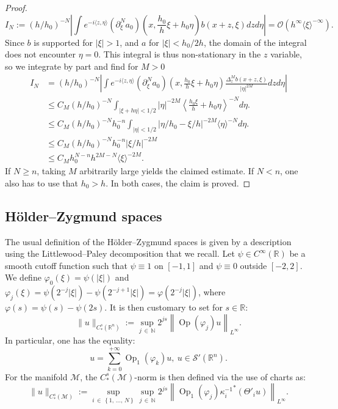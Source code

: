 \documentclass[AHL,Unicode,longabstracts,published]{cedram}
\newcommand{\R}{\mathbb{R}}
\newcommand{\N}{\mathbb{N}}
\newcommand{\M}{\mathcal{M}}
\newcommand{\clO}{\mathcal{O}}
\newcommand{\clS}{\mathcal{S}}
\DeclareMathOperator{\Op}{Op}
\begin{document}
\begin{proof}
\[
I_N :=(h/h_0)^{-N}\left| \int e^{-i \langle z, \eta \rangle } \left(\partial_\xi^N a_0\right)\left(x, \frac{h_0}{h}\xi + h_0\eta\right) b(x+z, \xi) dz d\eta \right| = \clO\left(h^\infty \langle \xi\rangle^{-\infty}\right).
\]
Since $b$ is supported for $|\xi|>1$, and $a$ for $|\xi| < h_0/2h$, the domain of the integral does not encounter $\eta = 0$. This integral is thus non-stationary in the $z$ variable, so we integrate by part and find for $M>0$
\begin{align*}
I_N &= (h/h_0)^{-N} \left| \int e^{-i \langle z, \eta \rangle } \left(\partial_\xi^N a_0\right)\left(x, \frac{h_0}{h}\xi + h_0\eta\right) \frac{\Delta_z^M b(x+z, \xi)}{|\eta|^{2M}} dz d\eta \right| \\
&\leq C_M (h/h_0)^{-N} \int_{|\xi + h\eta|< 1/2} |\eta|^{-2M} \left\langle \frac{h_0\xi}{h}+h_0\eta\right\rangle^{-N} d\eta. \\
&\leq C_M (h/h_0)^{-N} h_0^{-n} \int_{|\eta|< 1/2} \left|\eta/h_0 - \xi/h\right|^{-2M} \langle \eta \rangle^{-N} d\eta.\\
&\leq C_M (h/h_0)^{-N} h_0^{-n} |\xi/h|^{-2M} \\
&\leq C_M h_0^{N-n} h^{2M- N} \langle\xi\rangle^{-2M}.
\end{align*}
If $N \geq n$, taking $M$ arbitrarily large yields the claimed estimate. If $N < n$, one also has to use that $h_0 > h$. In both cases, the claim is proved.
\end{proof}



\subsection{H\"older--Zygmund spaces}\label{ssection:hz-spaces}



The usual definition of the H\"older--Zygmund spaces is given by a description using the Littlewood--Paley decomposition that we recall. Let $\psi \in C^\infty(\R)$ be a smooth cutoff function such that $\psi \equiv 1$ on $[-1,1]$ and $\psi \equiv 0$ outside $[-2,2]$. We define $\varphi_0(\xi) = \psi(|\xi|)$ and $\varphi_j(\xi) = \psi(2^{-j}|\xi|) - \psi(2^{-j+1}|\xi|) = \varphi(2^{-j}|\xi|)$, where $\varphi(s) = \psi(s)-\psi(2s)$. It is then customary to set for $s \in \R$:
\[
\|u\|_{C^s_*(\R^n)} := \sup_{j\,\in\,\N} 2^{js} \left\|\Op(\varphi_j)u\right\|_{L^\infty}.
\]
In particular, one has the equality:
\[
u = \sum_{k=0}^{+\infty} \Op_1(\varphi_k) u,\ u\in \clS'(\R^n).
\]
For the manifold $\M$, the $C^s_\ast(\M)$-norm is then defined via the use of charts as:
\begin{equation}\label{equation:definition-co}
\|u\|_{C^s_*(\M)} := \sup_{i\,\in\,\left\{1,\,\dots,\,N\right\}} \sup_{j\,\in\,\N} 2^{js} \left\|\Op_1(\varphi_j) {\kappa_i^{-1}}^*(\Theta'_i u)\right\|_{L^\infty}.
\end{equation}
\end{document}
